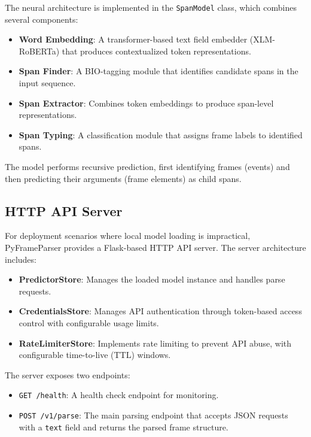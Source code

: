 The neural architecture is implemented in the \texttt{SpanModel} class, which combines several components:
\begin{itemize}
    \item \textbf{Word Embedding}: A transformer-based text field embedder (XLM-RoBERTa) that produces contextualized token representations.
    \item \textbf{Span Finder}: A BIO-tagging module that identifies candidate spans in the input sequence.
    \item \textbf{Span Extractor}: Combines token embeddings to produce span-level representations.
    \item \textbf{Span Typing}: A classification module that assigns frame labels to identified spans.
\end{itemize}

The model performs recursive prediction, first identifying frames (events) and then predicting their arguments (frame elements) as child spans.

\subsection{HTTP API Server}

For deployment scenarios where local model loading is impractical, PyFrameParser provides a Flask-based HTTP API server. The server architecture includes:

\begin{itemize}
    \item \textbf{PredictorStore}: Manages the loaded model instance and handles parse requests.
    \item \textbf{CredentialsStore}: Manages API authentication through token-based access control with configurable usage limits.
    \item \textbf{RateLimiterStore}: Implements rate limiting to prevent API abuse, with configurable time-to-live (TTL) windows.
\end{itemize}

The server exposes two endpoints:
\begin{itemize}
    \item \texttt{GET /health}: A health check endpoint for monitoring.
    \item \texttt{POST /v1/parse}: The main parsing endpoint that accepts JSON requests with a \texttt{text} field and returns the parsed frame structure.
\end{itemize}

